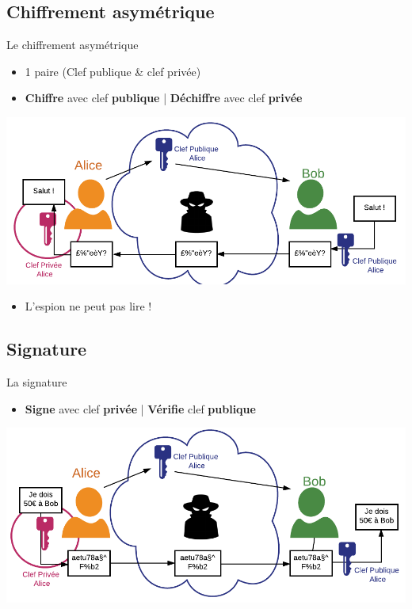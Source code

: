 \documentclass{beamer}
\begin{document}
\subsection{Chiffrement asymétrique}
\begin{frame}{Le chiffrement asymétrique}
	\begin{itemize}
	\item 1 paire (Clef publique \& clef privée)
	\item \textbf{Chiffre} avec clef \textbf{publique} | \textbf{Déchiffre} avec clef \textbf{privée}
	\end{itemize}
	\includegraphics[keepaspectratio, scale=0.35]{figures/chiffrement.png}
	\pause
	\begin{itemize}
	\item L'espion ne peut pas lire !
	\end{itemize}
\end{frame}

\subsection{Signature}
\begin{frame}{La signature}
	\begin{itemize}
	\item \textbf{Signe} avec clef \textbf{privée} | \textbf{Vérifie} clef \textbf{publique}
	\end{itemize}
	\includegraphics[keepaspectratio, scale=0.36]{figures/signature1.png}
\end{frame}
\end{document}
